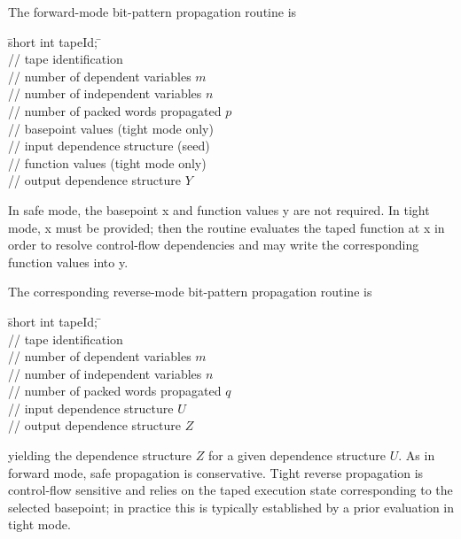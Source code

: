 \documentclass[11pt,twoside]{article}
\begin{document}
The forward-mode bit-pattern propagation routine is
\begin{tabbing}
\hspace{0.5in}\={\sf short int tapeId;} \hspace{1.1in}\= \kill
{}\\
                 \> // tape identification \\
                            \> // number of dependent variables $m$\\
                            \> // number of independent variables $n$\\
                            \> // number of packed words propagated $p$\\
                      \> // basepoint values (tight mode only)\\
                 \> // input dependence structure (seed)\\
                      \> // function values (tight mode only)\\
                 \> // output dependence structure $Y$ \\
\end{tabbing}
%
In safe mode, the basepoint {\sf x} and function values {\sf y} are not required.
In tight mode, {\sf x} must be provided; then the routine evaluates the
taped function at {\sf x} in order to resolve control-flow dependencies and
may write the corresponding function values into {\sf y}.

The corresponding reverse-mode bit-pattern propagation routine is
\begin{tabbing}
\hspace{0.5in}\={\sf short int tapeId;} \hspace{1.1in}\= \kill
{}\\
                 \> // tape identification \\
                            \> // number of dependent variables $m$\\
                            \> // number of independent variables $n$\\
                            \> // number of packed words propagated $q$\\
                 \> // input dependence structure $U$ \\
                 \> // output dependence structure $Z$ \\
\end{tabbing}
%
yielding the dependence structure $Z$ for a given dependence structure $U$.
As in forward mode, safe propagation is conservative. Tight reverse propagation
is control-flow sensitive and relies on the taped execution state corresponding
to the selected basepoint; in practice this is typically established by a prior
evaluation in tight mode.
\end{document}
